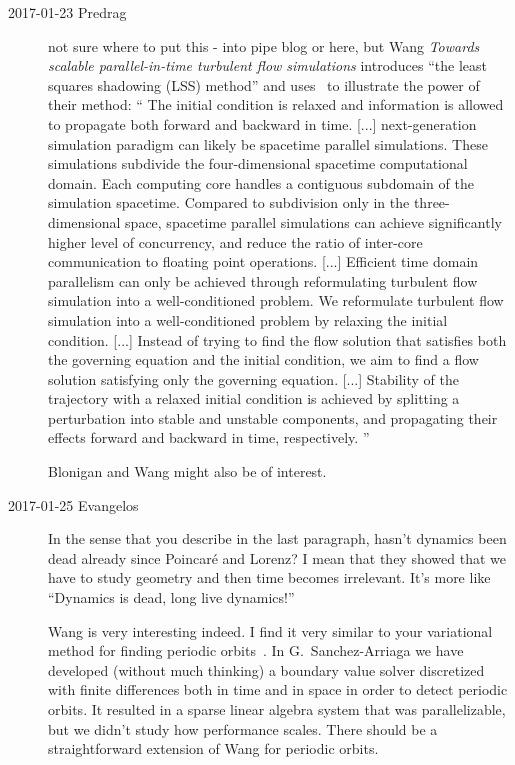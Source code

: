 \begin{description}
\item[2017-01-23 Predrag]
not sure where to put this - into pipe blog or here, but
Wang \etal{}
{\em Towards scalable parallel-in-time turbulent flow simulations}
introduces ``the least squares shadowing (LSS) method'' and
uses \KS\ to illustrate the power of their method: ``
The initial condition is relaxed and information is allowed to propagate
both forward and backward in time. [...]
next-generation simulation paradigm can likely be spacetime parallel
simulations. These simulations subdivide the four-dimensional spacetime
computational domain. Each computing core handles a contiguous subdomain
of the simulation spacetime. Compared to subdivision only in the
three-dimensional space, spacetime parallel simulations can achieve
significantly higher level of concurrency, and reduce the ratio of
inter-core communication to floating point operations. [...]
Efficient time domain parallelism can only be achieved through
reformulating turbulent flow simulation into a well-conditioned problem.
We reformulate turbulent flow simulation into a well-conditioned problem
by relaxing the initial condition.
 [...]
Instead of trying to find the flow solution that satisfies both the
governing equation and the initial condition, we aim to find a flow
solution satisfying only the governing equation.
 [...]
Stability of the trajectory with a relaxed initial condition is achieved
by splitting a perturbation into stable and unstable components, and
propagating their effects forward and backward in time, respectively.
''

Blonigan and Wang might also be of interest.

\item[2017-01-25 Evangelos] In the sense that you describe in the last paragraph,
hasn't dynamics been dead already since Poincar\'e and Lorenz?
I mean that they showed that we have to study geometry and then time becomes
irrelevant. It's more like ``Dynamics is dead, long live dynamics!''

Wang \etal{} is very interesting indeed. I find it very similar
to your variational method for finding periodic orbits~.
In G.~Sanchez-Arriaga \etal{} we have developed (without much thinking)
a boundary value solver discretized with finite differences both in time
and in space in order to detect periodic orbits. It resulted in a sparse
linear algebra system that was parallelizable, but we didn't study
how performance scales. There should be a straightforward extension of
Wang \etal{} for periodic orbits.


\end{description}
